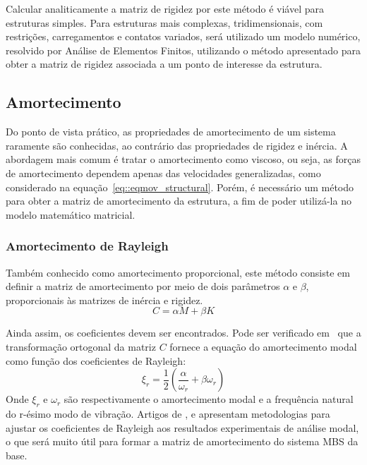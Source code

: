 Calcular analiticamente a matriz de rigidez por este método é viável para
estruturas simples. Para estruturas mais complexas, tridimensionais, com
restrições, carregamentos e contatos variados, será utilizado um modelo
numérico, resolvido por Análise de Elementos Finitos, utilizando o método
apresentado para obter a matriz de rigidez associada a um ponto de interesse da
estrutura.


\subsection{Amortecimento} \label{sec::amortecimento}

Do ponto de vista prático, as propriedades de amortecimento de um sistema
raramente são conhecidas, ao contrário das propriedades de rigidez e inércia.
A abordagem mais comum é tratar o amortecimento como viscoso, ou seja, as forças
de amortecimento dependem apenas das velocidades generalizadas, como considerado
na equação~\ref{eq::eqmov_structural}.
Porém, é necessário um método para obter a matriz de amortecimento da estrutura,
a fim de poder utilizá-la no modelo matemático matricial.

\subsubsection{Amortecimento de Rayleigh} \label{sec::amortecimento_revbib}

Também conhecido como amortecimento proporcional, este método consiste em
definir a matriz de amortecimento por meio de dois parâmetros $\alpha$ e
$\beta$, proporcionais às matrizes de inércia e rigidez. 
%
\begin{equation}
	C = \alpha M + \beta K	
\end{equation}
%

Ainda assim, os coeficientes devem ser encontrados. Pode ser verificado
em~\cite{craig2006fundamentals} que a transformação ortogonal da matriz $C$
fornece a equação do amortecimento modal como função dos coeficientes
de Rayleigh:
%
\begin{equation} \label{eq::xir}
	\xi_r = \frac{1}{2}\left(\frac{\alpha}{\omega_r} + \beta \omega_r\right )
\end{equation}
%
Onde $\xi_r$ e $\omega_r$ são respectivamente o amortecimento modal e a
frequência natural do r-ésimo modo de vibração. Artigos de
\citet{chen1996estimation}, \citet{adhikari2004rayleigh} e
\citet{schwarz2013proportional} apresentam metodologias para ajustar os
coeficientes de Rayleigh aos resultados experimentais de análise modal, o que
será muito útil para formar a matriz de amortecimento do sistema MBS da base.


